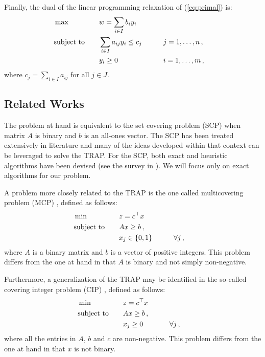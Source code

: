 \documentclass[runningheads]{llncs}
\begin{document}
Finally, the dual of the linear programming relaxation of (\ref{eq:primal}) is:
\begin{alignat}{3}
  &\max & \quad & w = \sum_{i \in I} b_i y_i \label{eq:dual}\\
  &\text{subject to}  &       & \sum_{i \in I} a_{ij} y_i \le c_j & \qquad & j = 1,\dots,n \, , \notag\\
  &                   &       & y_i \ge 0  &\qquad& i = 1,\dots,m \, , \notag
\end{alignat}
where $c_j = \sum_{i \in I} a_{ij}$ for all $j \in J$.

\subsection{Related Works}
\label{subsec:problem:related_works}

The problem at hand is equivalent to the set covering problem (SCP) when matrix $A$ is binary and $b$ is an all-ones vector. The SCP has been treated extensively in literature and many of the ideas developed within that context can be leveraged to solve the TRAP. For the SCP, both exact and heuristic algorithms have been devised (see the survey in \cite{caprara-2000-algorithms}). We will focus only on exact algorithms for our problem.

A problem more closely related to the TRAP is the one called multicovering problem (MCP) \cite{hall-hochbaum-1992-multicovering}, defined as follows:
\begin{alignat}{3}
  &\min & \quad & z = c^\top x \notag\\
  &\text{subject to}  &       & Ax \ge b \, , \notag\\
  &                   &       & x_j \in \{0, 1\}  & \qquad & \forall j \, , \notag
\end{alignat}
where $A$ is a binary matrix and $b$ is a vector of positive integers. This problem differs from the one at hand in that $A$ is binary and not simply non-negative.

Furthermore, a generalization of the TRAP may be identified in the so-called covering integer problem (CIP) \cite{kolliopoulos-2003-approximating}, defined as follows:
\begin{alignat}{3}
  &\min & \quad & z = c^\top x \notag\\
  &\text{subject to}  &       & Ax \ge b \, , \notag\\
  &                   &       & x_j \ge 0  & \qquad & \forall j \, , \notag
\end{alignat}
where all the entries in $A$, $b$ and $c$ are non-negative. This problem differs from the one at hand in that $x$ is not binary. 
\end{document}
